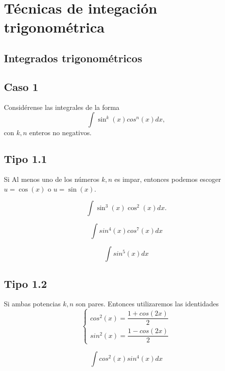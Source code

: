 \section{Técnicas de integaci\'on trigonométrica}

\subsection{Integrados trigonométricos}


\subsection{Caso 1}
 Considérense las integrales de la forma
 $$
 \int \sin^{k}(x)cos^{n}(x)dx,
 $$ con $k,n$ enteros no negativos.



\subsection{Tipo 1.1}
 Si Al menos uno de los números $k,n$ es impar, entonces podemos escoger $u=\cos(x)$ o $u=\sin(x).$



 \begin{resuelto}
  \label{ayr:32.1}
  $$
  \int \sin^{3}(x)\cos^{2}(x)dx.
  $$
 \end{resuelto}




 \begin{resuelto}
 \label{ayr:32.2}
  $$
  \int sin^{4}(x)cos^{7}(x)dx
  $$
 \end{resuelto}




 \begin{resuelto}
  \label{ayr:32.3}
  $$
  \int sin^{5}(x)dx
  $$
 \end{resuelto}




\subsection{Tipo 1.2}
 Si ambas potencias $k,n$ son pares. Entonces utilizaremos las identidades
 $$\begin{cases}
    cos^{2}(x)=\dfrac{1+cos(2x)}{2}\\
    sin^{2}(x)=\dfrac{1-cos(2x)}{2}
   \end{cases}
$$



 \begin{resuelto}
  \label{ayr:32.4}
  $$
  \int cos^{2}(x)sin^{4}(x)dx
  $$
 \end{resuelto}




